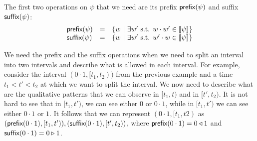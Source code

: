 The first two operations on $\psi$ that we need are its prefix $\textsf{prefix}(\psi)$ and suffix $\textsf{suffix}(\psi)$:
\begin{equation}
\begin{array}{lcl}
\textsf{prefix}(\psi) & = & \{ w~|~ \exists w' \text{ s.t. } w\cdot w' \in \llbracket \psi \rrbracket \} \\
\textsf{suffix}(\psi) & = & \{ w~|~ \exists w' \text{ s.t. } w'\cdot w \in \llbracket \psi \rrbracket \} \\
\end{array}
\end{equation}

\begin{example}
 We need the prefix and the suffix operations when we need to split an interval into two intervals and describe what is allowed in each interval. For example, consider the interval $(0\cdot 1, [t_1, t_2))$ from the previous example and a time $t_1 < t' < t_2$ at which we want to split the interval. We now need to describe what are the qualitative patterns that we can observe in $[t_1, t)$ and in $[t', t_2)$. It is not hard to see that in $[t_1, t')$, we can see either $0$ or $0 \cdot 1$, while in $[t_1, t')$ we can see either $0 \cdot 1$ or $1$. It follows that we can represent $(0 \cdot 1, [t_1, t2)$ as $(\textsf{prefix}(0\cdot 1), [t_1, t')), (\textsf{suffix}(0 \cdot 1), [t', t_2))$, where $\textsf{prefix}(0 \cdot 1) = 0 \triangleleft 1$ and $\textsf{suffix}(0 \cdot 1) = 0 \triangleright 1$. 
\end{example}